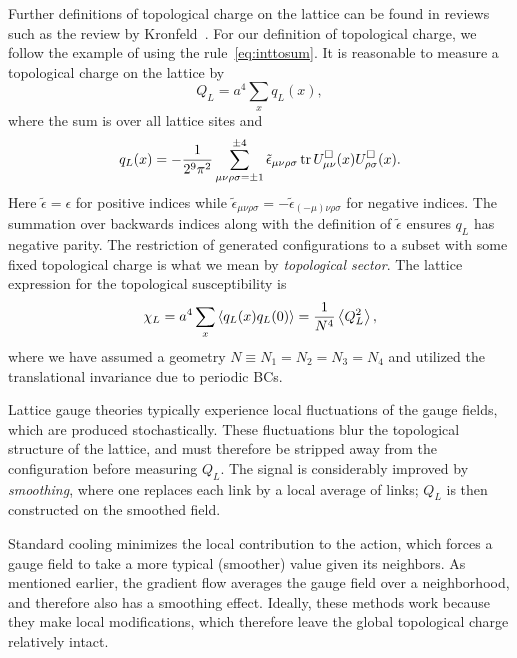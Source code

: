 Further definitions of topological charge on the lattice can be found 
in reviews such as the review by Kronfeld~\cite{kronfeld_topological_1988}.
For our definition of topological charge, we follow the example of 
 using the rule~\eqref{eq:inttosum}. It is reasonable to 
measure a topological charge on the lattice by
\begin{equation}\label{eq:QL}
  Q_L=a^4\sum_x q_L(x),
\end{equation}
where the sum is over all lattice sites and
\begin{equation}\label{eq:QLdensity}
  q_L(x) = -\frac{1}{2^9\pi^2}\sum\limits_{\mu\nu\rho\sigma=\pm 1}^{\pm 4}
         \tilde{\epsilon}_{\mu\nu\rho\sigma}
         \tr U^\Box_{\mu\nu}(x)U^\Box_{\rho\sigma}(x).
\end{equation}
Here $\tilde{\epsilon}=\epsilon$ for positive indices while
$\tilde{\epsilon}_{\mu\nu\rho\sigma}=
  -\tilde{\epsilon}_{(-\mu)\nu\rho\sigma}$ for negative indices.
The summation over backwards indices along with the definition of
$\tilde{\epsilon}$ ensures $q_L$ has negative parity.
The restriction of generated configurations to a subset with some fixed
topological charge is what we mean by 
{\it topological sector}.
The lattice expression for the topological susceptibility is
\begin{equation}
  \chi_L=a^4\sum_x\ev{q_L(x)q_L(0)}=\frac{1}{N^4}\ev{Q_L^2},
\end{equation}
where we have assumed a geometry $N\equiv N_1=N_2=N_3=N_4$
and utilized the translational invariance due to periodic BCs.

Lattice gauge theories typically experience
local fluctuations of the gauge fields, which are produced stochastically. 
These fluctuations blur the topological structure of the lattice, and 
must therefore be stripped away from the configuration before measuring 
$Q_L$. The signal is considerably improved by 
{\it smoothing}, where one replaces each link by a local average of links; 
$Q_L$ is then constructed on the smoothed field. 

Standard cooling minimizes the local contribution
to the action, which forces a gauge field to take a more typical
(smoother) value given its neighbors.
As mentioned earlier, the gradient flow averages the gauge field over 
a neighborhood, and therefore also has a smoothing effect. 
Ideally, these methods work because they make local modifications,
which therefore leave the global topological charge relatively intact.

